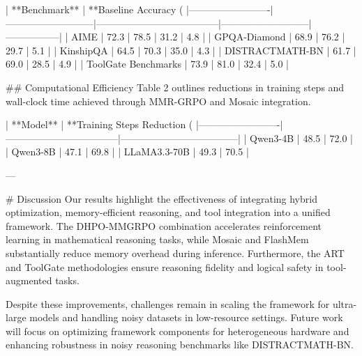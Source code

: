 | **Benchmark**         | **Baseline Accuracy (%
|-------------------------|---------------------------|--------------------------------------|---------------------------|-----------------|  
| AIME                   | 72.3                     | 78.5                                 | 31.2                      | 4.8             |  
| GPQA-Diamond           | 68.9                     | 76.2                                 | 29.7                      | 5.1             |  
| KinshipQA              | 64.5                     | 70.3                                 | 35.0                      | 4.3             |  
| DISTRACTMATH-BN        | 61.7                     | 69.0                                 | 28.5                      | 4.9             |  
| ToolGate Benchmarks    | 73.9                     | 81.0                                 | 32.4                      | 5.0             |  

## Computational Efficiency  
Table 2 outlines reductions in training steps and wall-clock time achieved through MMR-GRPO and Mosaic integration.  

| **Model**              | **Training Steps Reduction (%
|-------------------------|-----------------------------------|------------------------------------|  
| Qwen3-4B               | 48.5                            | 72.0                               |  
| Qwen3-8B               | 47.1                            | 69.8                               |  
| LLaMA3.3-70B           | 49.3                            | 70.5                               |  

---

# Discussion  
Our results highlight the effectiveness of integrating hybrid optimization, memory-efficient reasoning, and tool integration into a unified framework. The DHPO-MMGRPO combination accelerates reinforcement learning in mathematical reasoning tasks, while Mosaic and FlashMem substantially reduce memory overhead during inference. Furthermore, the ART and ToolGate methodologies ensure reasoning fidelity and logical safety in tool-augmented tasks.  

Despite these improvements, challenges remain in scaling the framework for ultra-large models and handling noisy datasets in low-resource settings. Future work will focus on optimizing framework components for heterogeneous hardware and enhancing robustness in noisy reasoning benchmarks like DISTRACTMATH-BN.  

